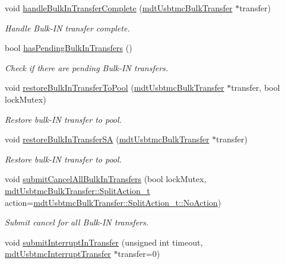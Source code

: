 \begin{DoxyCompactItemize}
void \hyperlink{classmdt_usbtmc_transfer_handler_a9cc55b0e48365e7deab2981a733c3343}{handle\-Bulk\-In\-Transfer\-Complete} (\hyperlink{classmdt_usbtmc_bulk_transfer}{mdt\-Usbtmc\-Bulk\-Transfer} $\ast$transfer)
\begin{DoxyCompactList}\small\item\em Handle Bulk-\/\-I\-N transfer complete. \end{DoxyCompactList}\item 
bool \hyperlink{classmdt_usbtmc_transfer_handler_a36bddb88b47a6622dc90749f86022976}{has\-Pending\-Bulk\-In\-Transfers} ()
\begin{DoxyCompactList}\small\item\em Check if there are pending Bulk-\/\-I\-N transfers. \end{DoxyCompactList}\item 
void \hyperlink{classmdt_usbtmc_transfer_handler_ac738d656946c3188e7b75e383b2faabf}{restore\-Bulk\-In\-Transfer\-To\-Pool} (\hyperlink{classmdt_usbtmc_bulk_transfer}{mdt\-Usbtmc\-Bulk\-Transfer} $\ast$transfer, bool lock\-Mutex)
\begin{DoxyCompactList}\small\item\em Restore bulk-\/\-I\-N transfer to pool. \end{DoxyCompactList}\item 
void \hyperlink{classmdt_usbtmc_transfer_handler_ade5c1500167266a8571d5a01b544100d}{restore\-Bulk\-In\-Transfer\-S\-A} (\hyperlink{classmdt_usbtmc_bulk_transfer}{mdt\-Usbtmc\-Bulk\-Transfer} $\ast$transfer)
\begin{DoxyCompactList}\small\item\em Restore bulk-\/\-I\-N transfer to pool. \end{DoxyCompactList}\item 
void \hyperlink{classmdt_usbtmc_transfer_handler_aa34dd4279e9dfef08d638285292036e8}{submit\-Cancel\-All\-Bulk\-In\-Transfers} (bool lock\-Mutex, \hyperlink{classmdt_usbtmc_bulk_transfer_a81f2309d821053cd7c8f6e32aff93b7c}{mdt\-Usbtmc\-Bulk\-Transfer\-::\-Split\-Action\-\_\-t} action=\hyperlink{classmdt_usbtmc_bulk_transfer_a81f2309d821053cd7c8f6e32aff93b7ca1e601ea653db1c729c9ee5746730fabe}{mdt\-Usbtmc\-Bulk\-Transfer\-::\-Split\-Action\-\_\-t\-::\-No\-Action})
\begin{DoxyCompactList}\small\item\em Submit cancel for all Bulk-\/\-I\-N transfers. \end{DoxyCompactList}\item 
void \hyperlink{classmdt_usbtmc_transfer_handler_ab6987e42a043dd860130e01f5f01a3ba}{submit\-Interrupt\-In\-Transfer} (unsigned int timeout, \hyperlink{classmdt_usbtmc_interrupt_transfer}{mdt\-Usbtmc\-Interrupt\-Transfer} $\ast$transfer=0)

\end{DoxyCompactItemize}
